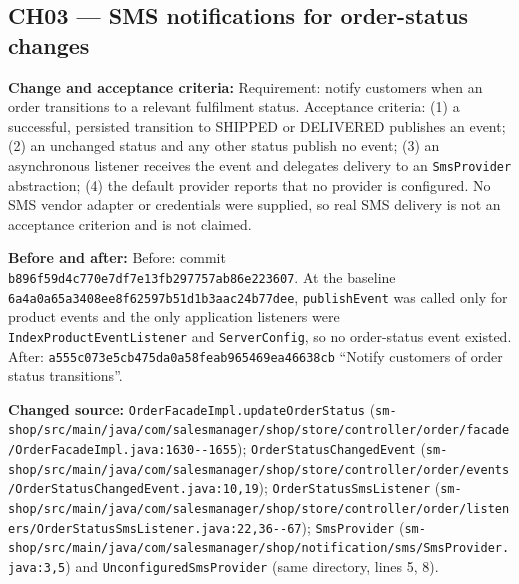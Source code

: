 \documentclass[11pt,a4paper]{article}
\begin{document}
\subsection*{CH03 --- SMS notifications for order-status changes}

\textbf{Change and acceptance criteria:} Requirement: notify customers when an order transitions to a relevant fulfilment status. Acceptance criteria: (1) a successful, persisted transition to SHIPPED or DELIVERED publishes an event; (2) an unchanged status and any other status publish no event; (3) an asynchronous listener receives the event and delegates delivery to an \texttt{Sms\allowbreak{}Provider} abstraction; (4) the default provider reports that no provider is configured. No SMS vendor adapter or credentials were supplied, so real SMS delivery is not an acceptance criterion and is not claimed.

\textbf{Before and after:} Before: commit \texttt{b896f59d4c770e7df7e13fb297757ab86e223607}. At the baseline \texttt{6a4a0a65a3408ee8f62597b51d1b3aac24b77dee}, \texttt{publish\allowbreak{}Event} was called only for product events and the only application listeners were \texttt{Index\allowbreak{}Product\allowbreak{}Event\allowbreak{}Listener} and \texttt{Server\allowbreak{}Config}, so no order-status event existed. After: \texttt{a555c073e5cb475da0a58feab965469ea46638cb} ``Notify customers of order status transitions''.

\textbf{Changed source:} \texttt{OrderFacadeImpl.\allowbreak{}updateOrderStatus} (\texttt{sm-\allowbreak{}shop/\allowbreak{}src/\allowbreak{}main/\allowbreak{}java/\allowbreak{}com/\allowbreak{}salesmanager/\allowbreak{}shop/\allowbreak{}store/\allowbreak{}controller/\allowbreak{}order/\allowbreak{}facade/\allowbreak{}OrderFacadeImpl.\allowbreak{}java:1630-\allowbreak{}-\allowbreak{}1655}); \texttt{Order\allowbreak{}Status\allowbreak{}Changed\allowbreak{}Event} (\texttt{sm-\allowbreak{}shop/\allowbreak{}src/\allowbreak{}main/\allowbreak{}java/\allowbreak{}com/\allowbreak{}salesmanager/\allowbreak{}shop/\allowbreak{}store/\allowbreak{}controller/\allowbreak{}order/\allowbreak{}events/\allowbreak{}OrderStatusChangedEvent.\allowbreak{}java:10,19}); \texttt{Order\allowbreak{}Status\allowbreak{}Sms\allowbreak{}Listener} (\texttt{sm-\allowbreak{}shop/\allowbreak{}src/\allowbreak{}main/\allowbreak{}java/\allowbreak{}com/\allowbreak{}salesmanager/\allowbreak{}shop/\allowbreak{}store/\allowbreak{}controller/\allowbreak{}order/\allowbreak{}listeners/\allowbreak{}OrderStatusSmsListener.\allowbreak{}java:22,36-\allowbreak{}-\allowbreak{}67}); \texttt{Sms\allowbreak{}Provider} (\texttt{sm-\allowbreak{}shop/\allowbreak{}src/\allowbreak{}main/\allowbreak{}java/\allowbreak{}com/\allowbreak{}salesmanager/\allowbreak{}shop/\allowbreak{}notification/\allowbreak{}sms/\allowbreak{}SmsProvider.\allowbreak{}java:3,5}) and \texttt{Unconfigured\allowbreak{}Sms\allowbreak{}Provider} (same directory, lines 5, 8).
\end{document}
